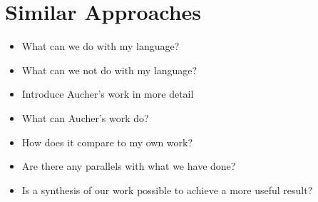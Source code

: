 \section{Similar Approaches}
\begin{itemize}
	\item What can we do with my language?
	\item What can we not do with my language?
	\item Introduce Aucher's work in more detail
	\item What can Aucher's work do?
	\item How does it compare to my own work?
	\item Are there any parallels with what we have done?
	\item Is a synthesis of our work possible to achieve a more useful result?
\end{itemize}
